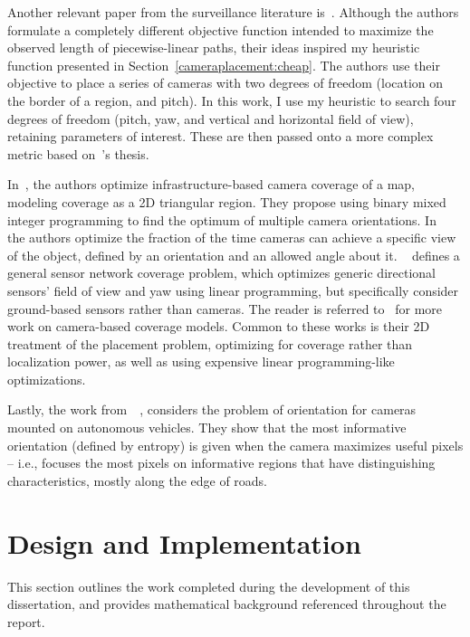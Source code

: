 \documentclass[a4paper,12pt,twoside,openright]{report}
\begin{document}
Another relevant paper from the surveillance literature is~\cite{bodor2007optimal}.
Although the authors formulate a completely different objective function intended
to maximize the observed length of piecewise-linear paths,
their ideas inspired my heuristic function presented 
in Section~\ref{cameraplacement:cheap}. The authors use their objective
to place a series of cameras with two degrees of freedom (location
on the border of a region, and pitch). In this work, I use my heuristic
to search four degrees of freedom (pitch, yaw, and vertical and
horizontal field of view), retaining parameters of interest. 
These are then passed onto a more complex metric based on~\citeauthor{beinhofer2014landmark}'s thesis.

In~\cite{horster2006optimal}, the authors optimize infrastructure-based camera coverage of a map,
modeling coverage as a 2D triangular region. They propose using binary
mixed integer programming to find the optimum of multiple camera orientations.
In~\cite{wang2013achieving} the authors optimize the fraction of the time cameras
can achieve a specific view of the object, defined by an orientation and an allowed angle about it.
~\cite{osais2010directional} defines a general sensor network coverage problem, which optimizes generic directional sensors'
field of view and yaw using linear programming, but specifically consider ground-based
sensors rather than cameras. The reader is referred to~\cite{guvensan2011coverage} for more work
on camera-based coverage models. Common to these works is their 2D treatment of the placement
problem, optimizing for coverage rather than localization power,
as well as using expensive linear programming-like optimizations.

Lastly, the work from~\citeauthor{bansal2014understanding}~\cite{bansal2014understanding}, 
considers the problem of orientation for cameras mounted on autonomous vehicles.
They show that the most informative orientation (defined by entropy) is given when the 
camera maximizes useful pixels -- i.e., focuses the most pixels on informative regions
that have distinguishing characteristics, mostly along the edge of roads.


\chapter{Design and Implementation}
\label{chap:impl}

This section outlines the work completed during the development
of this dissertation, and provides mathematical background
referenced throughout the report.
\end{document}
